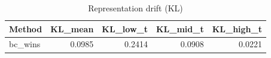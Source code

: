 \begin{table}[htbp]
\centering
\caption{Representation drift (KL)}
\label{tab:repr-drift}
\begin{tabular}{lrrrr}
\toprule
\textbf{Method} & \textbf{KL\_mean} & \textbf{KL\_low\_t} & \textbf{KL\_mid\_t} & \textbf{KL\_high\_t} \\
\midrule
bc\_wins & 0.0985 & 0.2414 & 0.0908 & 0.0221 \\
\bottomrule
\end{tabular}
\end{table}